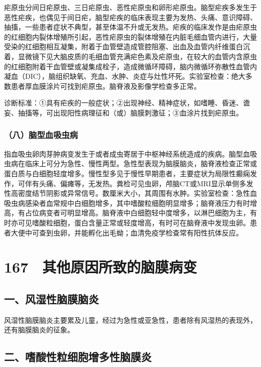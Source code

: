 疟原虫分间日疟原虫、三日疟原虫、恶性疟原虫和卵形疟原虫。脑型疟疾多发生于恶性疟疾，也偶见于间日疟，脑型疟疾的临床表现主要为发热、头痛、意识障碍、抽搐，一些患者症状不典型，甚至体温不升或无发热。疟疾的临床发作是由疟原虫的红细胞内裂体增殖所引起，恶性疟原虫的裂体增殖在内脏毛细血管内进行，大量受染的红细胞相互凝集，附着于血管壁造成管腔阻塞、出血及血管内纤维蛋白沉着，显微镜下见大脑皮质的毛细血管充满疟色素及疟原虫，在较大的血管内含原虫的红细胞附着干血管壁或凝集成栓子，造成微循环障碍，脑内微循环弥散性血管内凝血（DIC），脑组织缺氧、充血、水肿、炎症与灶性坏死。实验室检查：绝大多数患者厚血膜涂片可找到疟原虫。脑脊液及影像学检查多正常。

诊断标准：①具有疟疾的一般症状；②出现神经、精神症状，如嗜睡、昏迷、谵妄、抽搐等，可出现阳性病理征和（或）脑膜刺激征；③血涂片找到疟原虫。

\subsubsection{（八）脑型血吸虫病}

指血吸虫卵肉芽肿病变发生于或者成虫寄居于中枢神经系统造成的疾病。脑型血吸虫病在临床上可分为急性、慢性两型。急性型表现为脑膜脑炎，脑脊液检查正常或蛋白质与白细胞轻度增多。慢性型多见于慢性早期患者，主要症状为局限性癫痫发作，可伴有头痛、偏瘫等，无发热。粪检可见虫卵，颅脑CT或MRI显示单侧多发性高密度结节阴影或异常信号。数厘米大小，其周围有水肿。实验室检查：急性血吸虫病感染者血常规中白细胞增多，其中嗜酸粒细胞明显增多；脑脊液压力有时增高，有占位病变者可明显增高。脑脊液中白细胞轻中度增多，以淋巴细胞为主，有时亦可见嗜酸粒细胞，蛋白含量正常或轻度增高，有时可在脑脊液中发现虫卵。患者大便中可查到虫卵，并能孵化出毛蚴；血清免疫学检查常有阳性抗体反应。

\protect\hypertarget{text00391.html}{}{}

\section{167　其他原因所致的脑膜病变}

\subsection{一、风湿性脑膜脑炎}

风湿性脑膜脑炎主要累及儿童，经过为急性或亚急性，患者除有风湿热的表现外，还有脑膜脑炎的征象。

\subsection{二、嗜酸性粒细胞增多性脑膜炎}

